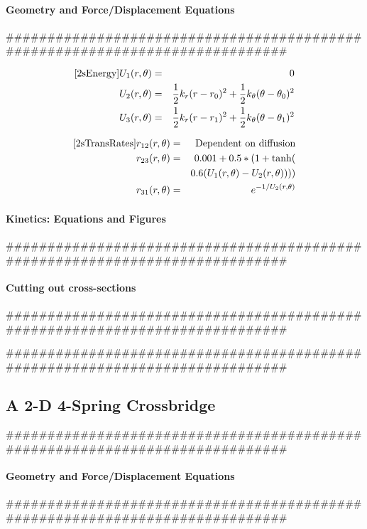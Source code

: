 \documentclass[11pt]{article}
\begin{document}
\begin{multicols}{2}
\paragraph*{Geometry and Force/Displacement Equations}
#############################################################################

\begin{eqnarray}
\ref{2sEnergy}
    U_1(r,\theta) & = & 0 \nonumber \\
    U_2(r,\theta) & = & \frac{1}{2}k_r (r - r_0)^2 + 
                        \frac{1}{2}k_\theta (\theta - \theta_0)^2 \nonumber \\
    U_3(r,\theta) & = & \frac{1}{2}k_r (r - r_1)^2 + 
                        \frac{1}{2}k_\theta (\theta - \theta_1)^2 \\
\end{eqnarray}

\begin{eqnarray}  
\ref{2sTransRates}
	r_{12}(r, \theta)   & = & \text{Dependent on diffusion} \nonumber \\
    r_{23}(r, \theta)   & = & 0.001 + 0.5 * (1 + \tanh( \nonumber \\
                        &   & 0.6 (U_1(r, \theta) - U_2(r, \theta)))) \\
	r_{31}(r, \theta)   & = & e^{-1 / U_2(r, \theta)}
\end{eqnarray} 

\paragraph*{Kinetics: Equations and Figures}
#############################################################################

\paragraph*{Cutting out cross-sections}
#############################################################################

#############################################################################
\subsection*{A 2-D 4-Spring Crossbridge}
#############################################################################

\paragraph*{Geometry and Force/Displacement Equations}
#############################################################################


\end{multicols}
\end{document}
